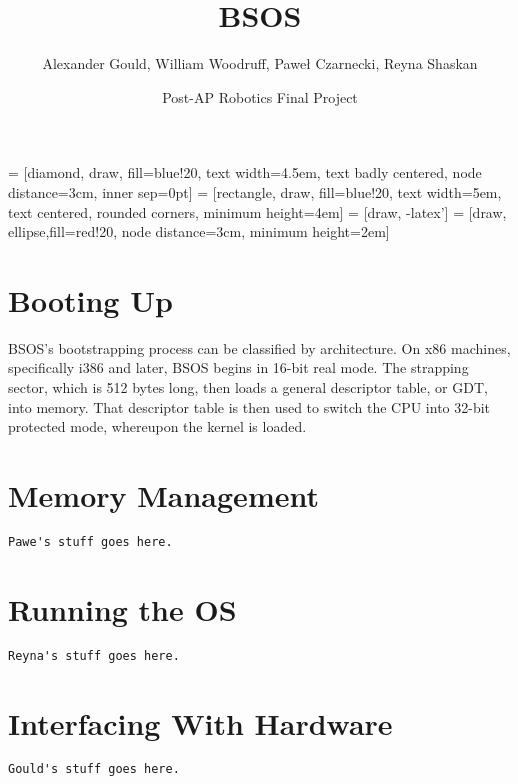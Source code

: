 \documentclass[english]{article}
\begin{document}
 = [diamond, draw, fill=blue!20, 
    text width=4.5em, text badly centered, node distance=3cm, inner sep=0pt]
 = [rectangle, draw, fill=blue!20, 
    text width=5em, text centered, rounded corners, minimum height=4em]
 = [draw, -latex']
 = [draw, ellipse,fill=red!20, node distance=3cm,
    minimum height=2em]

\title{BSOS}
\author{Alexander Gould, William Woodruff, Pawe\l{} Czarnecki, Reyna Shaskan}
\date{Post-AP Robotics Final Project}
\maketitle

\begin{abstract}

\end{abstract}

\section{Booting Up}
BSOS's bootstrapping process can be classified by architecture. On x86 machines, specifically i386 and later, BSOS begins in 16-bit real mode. The strapping sector, which is 512 bytes long, then loads a general descriptor table, or GDT, into memory. That descriptor table is then used to switch the CPU into 32-bit protected mode, whereupon the kernel is loaded.

\section{Memory Management}

\begin{lstlisting}
Pawe's stuff goes here.
\end{lstlisting}



\section{Running the OS}

\begin{lstlisting}
Reyna's stuff goes here.
\end{lstlisting}



\section{Interfacing With Hardware}

\begin{lstlisting}
Gould's stuff goes here.
\end{lstlisting}
\end{document}
